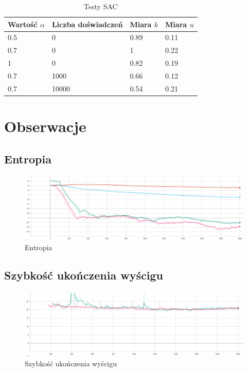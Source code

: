 \documentclass[a4paper,12pt]{article}
\let\oldsection\section
\renewcommand\section{\clearpage\oldsection}
\begin{document}
\begin{table}[H]
	\centering
	\smallskip
	\begin{tabular}{|l|l|l|l|}
		\hline
		Wartość $\alpha$ & Liczba doświadczeń & Miara $k$ & Miara $u$ \\
		\hline
		0.5 & 0 & 0.89 & 0.11 \\		
		0.7 & 0 & 1 & 0.22 \\		
		1 & 0 & 0.82 & 0.19 \\		
		0.7 & 1000 & 0.66 & 0.12 \\	
		0.7 & 10000 & 0.54 & 0.21 \\\hline
	\end{tabular}
	\caption{Testy SAC}
	\label{tab:sac}
\end{table}

\section{Obserwacje}
\subsection{Entropia}
\begin{figure}[H]
	\centering
	\includegraphics[width=\textwidth]{entropy}
	\caption{Entropia}
	\label{pic:entropy}
\end{figure}

\subsection{Szybkość ukończenia wyścigu}
\begin{figure}[H]
	\centering
	\includegraphics[width=\textwidth]{szybkosc}
	\caption{Szybkość ukończenia wyścigu}
	\label{pic:szybkosc}
\end{figure}
\end{document}
